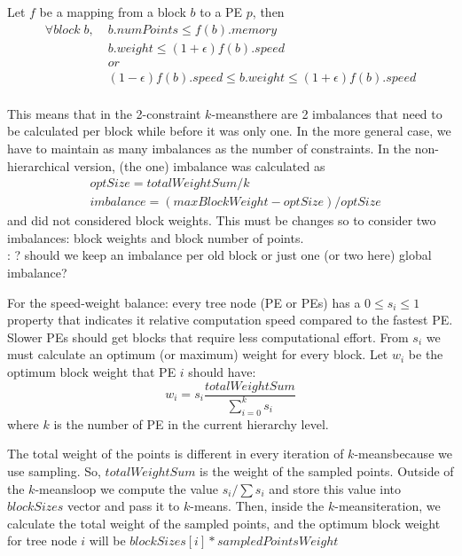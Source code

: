 \documentclass[a4paper,10pt]{article}
\newcommand{\red}[1]{{\color{red}{#1}}}
\newcommand{\km}{$k$-means}
\newcommand{\todo}[1]{{\red{TODO}}: #1}
\begin{document}
Let $f$ be a mapping from a block $b$ to a PE $p$, then
\begin{align*}
\forall block\;b,\; & b.numPoints \leq f(b).memory \\
& b.weight \leq (1+\epsilon)f(b).speed \\
& or\\
& (1-\epsilon)f(b).speed \leq b.weight \leq (1+\epsilon)f(b).speed \\
\end{align*}

This means that in the 2-constraint \km there are 2 imbalances that need to be calculated per block
while before it was only one. In the more general case, we have to maintain as many imbalances
as the number of constraints. In the non-hierarchical version, (the one) imbalance was
calculated as
\begin{align*}
& optSize = totalWeightSum/k \\
&imbalance = (maxBlockWeight-optSize)/optSize
\end{align*}
and did not considered block weights. This must be changes so to consider two imbalances:
block weights and block number of points.
\\\todo{? should we keep an imbalance per old block or just one (or two here) global imbalance?}

For the speed-weight balance: every tree node (PE or PEs) has a $0\leq s_i \leq 1$  property that 
indicates it relative computation speed compared to the fastest PE. Slower PEs should get blocks
that require less computational effort. From $s_i$ we must calculate an optimum (or maximum)
weight for every block. Let $w_i$ be the optimum block weight that PE $i$ should have:
$$
w_i = s_i \frac{totalWeightSum}{\sum_{i=0}^k s_i}
$$
where $k$ is the number of PE in the current hierarchy level.

The total weight of the points is different in every iteration of \km because we use sampling.
So, $totalWeightSum$ is the weight of the sampled points. Outside of the \km loop we compute the 
value $s_i/\sum s_i$ and store this value into $blockSizes$ vector and pass it to \km. Then,
inside the \km iteration, we calculate the total weight of the sampled points, and the optimum
block weight for tree node $i$ will be $blockSizes[i]*sampledPointsWeight$
\end{document}
